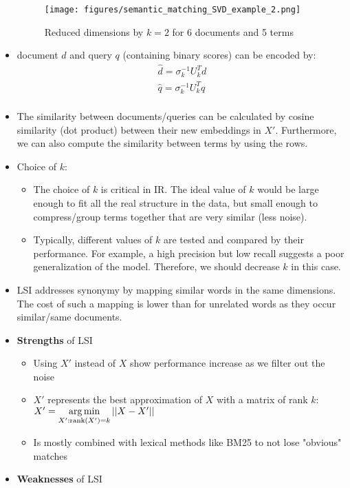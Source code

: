 \begin{itemize}
	\begin{figure}[ht]
		\centering
		\texttt{[image: figures/semantic\_matching\_SVD\_example\_2.png]}
		\caption{Reduced dimensions by $k=2$ for 6 documents and 5 terms}
		\label{img:semantic_matching_SVD_example_2}
	\end{figure}
	\item document $d$ and query $q$ (containing binary scores) can be encoded by:
	\begin{align*}
		\hat{d} = \sigma_k^{-1} U_k^T d \\
		\hat{q} = \sigma_k^{-1} U_k^T q \\
	\end{align*}
	\item The similarity between documents/queries can be calculated by cosine similarity (dot product) between their new embeddings in $X'$. Furthermore, we can also compute the similarity between terms by using the rows.
	\item Choice of $k$:
	\begin{itemize}
		\item The choice of $k$ is critical in IR. The ideal value of $k$ would be large enough to fit all the real structure in the data, but small enough to compress/group terms together that are very similar (less noise).
		\item Typically, different values of $k$ are tested and compared by their performance. For example, a high precision but low recall suggests a poor generalization of the model. Therefore, we should decrease $k$ in this case.
	\end{itemize}
	\item LSI addresses synonymy by mapping similar words in the same dimensions. The cost of such a mapping is lower than for unrelated words as they occur similar/same documents. 
	\item \textbf{Strengths} of LSI
	\begin{itemize}
		\item Using $X'$ instead of $X$ show performance increase as we filter out the noise
		\item $X'$ represents the best approximation of $X$ with a matrix of rank $k$: $X' = \operatorname*{arg\,min}\limits_{X':\text{rank}(X')=k} ||X-X'||$
		\item Is mostly combined with lexical methods like BM25 to not lose "obvious" matches
	\end{itemize}
	\item \textbf{Weaknesses} of LSI
	\begin{itemize}

\end{itemize}
\end{itemize}
